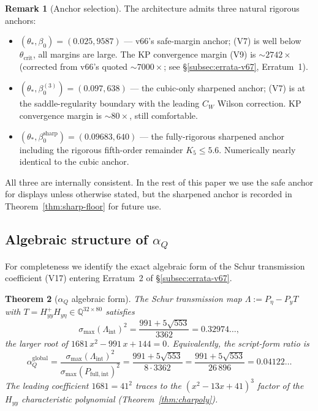 \documentclass[11pt]{article}
\newtheorem{theorem}{Theorem}[section]
\theoremstyle{definition}
\newtheorem{remark}[theorem]{Remark}
\newcommand{\Q}{\mathbb{Q}}
\begin{document}
\begin{remark}[Anchor selection]
The architecture admits three natural rigorous anchors:
\begin{itemize}[nosep]
\item $(\theta_*,\beta_0)=(0.025,9587)$ --- v66's safe-margin
anchor; (V7) is well below $\theta_{\mathrm{crit}}$, all
margins are large.  The KP convergence margin
(V9) is $\sim 2742\times$ (corrected from v66's quoted $\sim 7000\times$;
see \S\ref{subsec:errata-v67}, Erratum~1).
\item $(\theta_*,\beta_0^{(3)})=(0.097,638)$ --- the cubic-only
sharpened anchor; (V7) is at the saddle-regularity boundary
with the leading $C_W$ Wilson correction.  KP convergence margin
is $\sim 80\times$, still comfortable.
\item $(\theta_*,\beta_0^{\mathrm{sharp}})=(0.09683,640)$ --- the
fully-rigorous sharpened anchor including the rigorous fifth-order
remainder $K_5\le 5.6$.  Numerically nearly identical to the cubic
anchor.
\end{itemize}
All three are internally consistent.  In the rest of this paper we
use the safe anchor for displays unless otherwise stated, but the
sharpened anchor is recorded in Theorem~\ref{thm:sharp-floor} for
future use.
\end{remark}

\subsection{Algebraic structure of $\alpha_Q$}\label{subsec:alphaQ-algebraic}

For completeness we identify the exact algebraic form of the Schur
transmission coefficient (V17) entering Erratum~2 of
\S\ref{subsec:errata-v67}.

\begin{theorem}[$\alpha_Q$ algebraic form]\label{thm:alphaQ}
The Schur transmission map $\Lambda:=P_\eta-P_y T$ with
$T=H_{yy}^+ H_{y\eta}\in\Q^{32\times 80}$ satisfies
\begin{equation}\label{eq:alphaQ-def}
\sigma_{\max}(\Lambda_{\mathrm{int}})^2=\frac{991+5\sqrt{553}}{3362}=0.32974\ldots,
\end{equation}
the larger root of $1681\,x^2-991\,x+144=0$.  Equivalently,
the script-form ratio is
\[
\alpha_Q^{\mathrm{global}}=\frac{\sigma_{\max}(\Lambda_{\mathrm{int}})^2}{\sigma_{\max}(P_{\mathrm{full,int}})^2}
=\frac{991+5\sqrt{553}}{8\cdot 3362}=\frac{991+5\sqrt{553}}{26\,896}=0.04122\ldots
\]
The leading coefficient $1681=41^2$ traces to the $(x^2-13x+41)^3$
factor of the $H_{yy}$ characteristic polynomial
(Theorem~\ref{thm:charpoly}).
\end{theorem}
\end{document}
